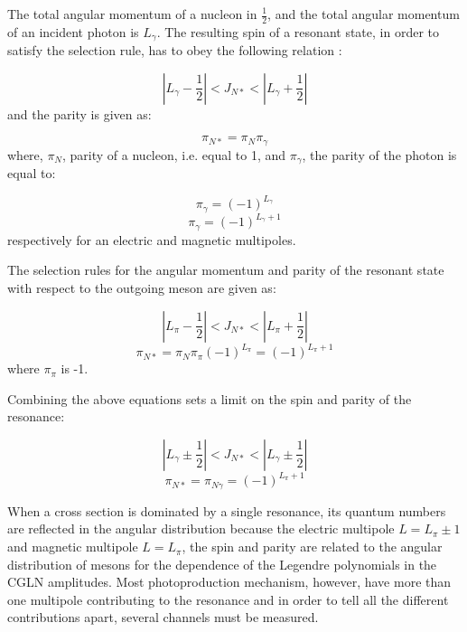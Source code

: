 \indent The total angular momentum of a nucleon in $\frac{1}{2}$, and the total angular momentum of an incident photon is $L_{\gamma}$. The resulting spin of a resonant state, in order to satisfy the selection rule, has to obey the following relation \cite{krusche}:

\begin{equation}
\left|L_{\gamma}-\frac{1}{2}\right|<J_{N*}<\left|L_{\gamma}+\frac{1}{2}\right|
\end{equation}
and the parity is given as:

\begin{equation}
\pi_{N*}=\pi_{N}\pi_{\gamma}
\end{equation}
where, $\pi_{N}$, parity of a nucleon, i.e. equal to 1, and $\pi_{\gamma}$, the parity of the photon is equal to:

\begin{equation}
\pi_{\gamma}=(-1)^{L_{\gamma}}
\end{equation}
\begin{equation}
\pi_{\gamma}=(-1)^{L_{\gamma}+1}
\end{equation}
respectively for an electric and magnetic multipoles.

\indent The selection rules for the angular momentum and parity of the resonant state with respect to the outgoing meson are given as:

\begin{equation}
\left|L_{\pi}-\frac{1}{2}\right|<J_{N*}<\left|L_{\pi}+\frac{1}{2}\right|
\end{equation}
\begin{equation}
\pi_{N*}=\pi_{N}\pi_{\pi}(-1)^{L_{\pi}}=(-1)^{L_{\pi}+1}
\end{equation}
where $\pi_{\pi}$ is -1.

\indent Combining the above equations sets a limit on the spin and parity of the resonance:

\begin{equation}
\left|L_{\gamma}\pm\frac{1}{2}\right|<J_{N*}<\left|L_{\gamma}\pm\frac{1}{2}\right|
\end{equation}
\begin{equation}
\pi_{N*}=\pi_{N\gamma}=(-1)^{L_{\pi}+1}
\end{equation}

\indent When a cross section is dominated by a single resonance, its quantum numbers are reflected in the angular distribution because the electric multipole $L={L_{\pi}\pm1}$ and magnetic multipole $L={L_{\pi}}$, the spin and parity are related to the angular distribution of mesons for the dependence of the Legendre polynomials in the CGLN amplitudes. Most photoproduction mechanism, however, have more than one multipole contributing to the resonance and in order to tell all the different contributions apart, several channels must be measured.

